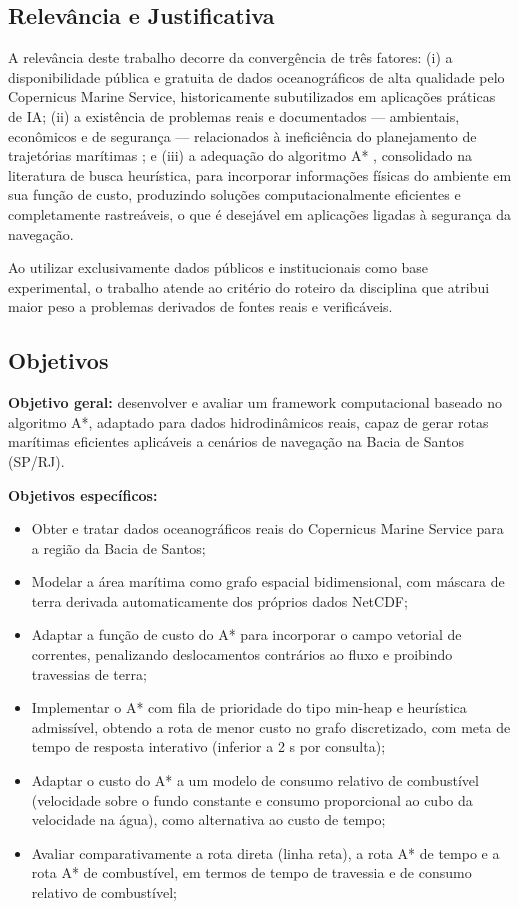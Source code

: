 \documentclass[conference]{IEEEtran}
\begin{document}
\subsection{Relevância e Justificativa}
A relevância deste trabalho decorre da convergência de três fatores: (i) a disponibilidade pública e gratuita de dados oceanográficos de alta qualidade pelo Copernicus Marine Service, historicamente subutilizados em aplicações práticas de IA; (ii) a existência de problemas reais e documentados --- ambientais, econômicos e de segurança --- relacionados à ineficiência do planejamento de trajetórias marítimas \cite{imo,unep}; e (iii) a adequação do algoritmo A* \cite{hart}, consolidado na literatura de busca heurística, para incorporar informações físicas do ambiente em sua função de custo, produzindo soluções computacionalmente eficientes e completamente rastreáveis, o que é desejável em aplicações ligadas à segurança da navegação.

Ao utilizar exclusivamente dados públicos e institucionais como base experimental, o trabalho atende ao critério do roteiro da disciplina que atribui maior peso a problemas derivados de fontes reais e verificáveis.

\subsection{Objetivos}
\textbf{Objetivo geral:} desenvolver e avaliar um framework computacional baseado no algoritmo A*, adaptado para dados hidrodinâmicos reais, capaz de gerar rotas marítimas eficientes aplicáveis a cenários de navegação na Bacia de Santos (SP/RJ).

\textbf{Objetivos específicos:}
\begin{itemize}
\item Obter e tratar dados oceanográficos reais do Copernicus Marine Service para a região da Bacia de Santos;
\item Modelar a área marítima como grafo espacial bidimensional, com máscara de terra derivada automaticamente dos próprios dados NetCDF;
\item Adaptar a função de custo do A* para incorporar o campo vetorial de correntes, penalizando deslocamentos contrários ao fluxo e proibindo travessias de terra;
\item Implementar o A* com fila de prioridade do tipo min-heap e heurística admissível, obtendo a rota de menor custo no grafo discretizado, com meta de tempo de resposta interativo (inferior a 2 s por consulta);
\item Adaptar o custo do A* a um modelo de consumo relativo de combustível (velocidade sobre o fundo constante e consumo proporcional ao cubo da velocidade na água), como alternativa ao custo de tempo;
\item Avaliar comparativamente a rota direta (linha reta), a rota A* de tempo e a rota A* de combustível, em termos de tempo de travessia e de consumo relativo de combustível;
\end{itemize}
\end{document}
